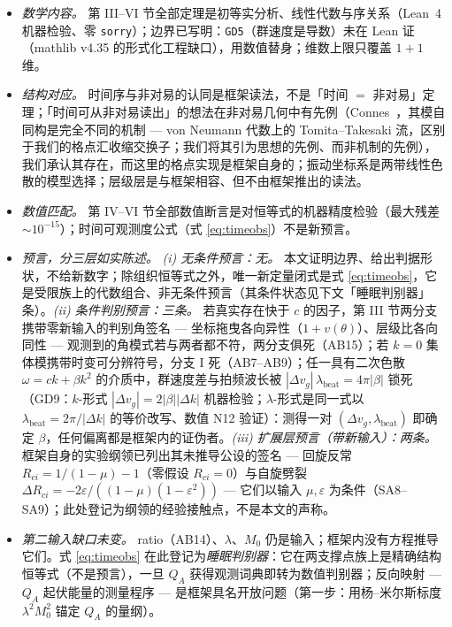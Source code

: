 \documentclass[aps,prd,preprint,superscriptaddress,amsmath,amssymb]{revtex4-2}
\begin{document}
\begin{itemize}
\item \emph{数学内容。} 第 III--VI 节全部定理是初等实分析、线性代数与序关系（Lean~4 机器检验、零 \texttt{sorry}）；边界已写明：\texttt{GD5}（群速度是导数）未在 Lean 证（mathlib v4.35 的形式化工程缺口），用数值替身；维数上限只覆盖 $1+1$ 维。
\item \emph{结构对应。} 时间序与非对易的认同是框架读法，不是「时间 $=$ 非对易」定理；「时间可从非对易读出」的想法在非对易几何中有先例（Connes~\cite{connes1994ncg}，其模自同构是完全不同的机制 --- von Neumann 代数上的 Tomita--Takesaki 流，区别于我们的格点汇收缩交换子；我们将其引为思想的先例、而非机制的先例），我们承认其存在，而这里的格点实现是框架自身的；振动坐标系是两带线性色散的模型选择；层级层是与框架相容、但不由框架推出的读法。
\item \emph{数值匹配。} 第 IV--VI 节全部数值断言是对恒等式的机器精度检验（最大残差 $\sim 10^{-15}$）；时间可观测度公式（式 \ref{eq:timeobs}）不是新预言。
\item \emph{预言，分三层如实陈述。} \emph{(i) 无条件预言：无。} 本文证明边界、给出判据形状，不给新数字；除组织恒等式之外，唯一新定量闭式是式 \ref{eq:timeobs}，它是受限族上的代数组合、非无条件预言（其条件状态见下文「睡眠判别器」条）。\emph{(ii) 条件判别预言：三条。} 若真实存在快于 $c$ 的因子，第 III 节两分支携带零新输入的判别角签名 --- 坐标拖曳各向异性（$1+v(\theta)$）、层级比各向同性 --- 观测到的角模式若与两者都不符，两分支俱死（AB15）；若 $k=0$ 集体模携带时变可分辨符号，分支 I 死（AB7--AB9）；任一具有二次色散 $\omega=ck+\beta k^2$ 的介质中，群速度差与拍频波长被 $|\Delta v_g|\,\lambda_{\mathrm{beat}}=4\pi|\beta|$ 锁死（GD9：$k$-形式 $|\Delta v_g|=2|\beta||\Delta k|$ 机器检验；$\lambda$-形式是同一式以 $\lambda_{\mathrm{beat}}=2\pi/|\Delta k|$ 的等价改写、数值 N12 验证）：测得一对 $(\Delta v_g,\lambda_{\mathrm{beat}})$ 即确定 $\beta$，任何偏离都是框架内的证伪者。\emph{(iii) 扩展层预言（带新输入）：两条。} 框架自身的实验纲领已列出其未推导公设的签名 --- 回旋反常 $R_{ci}=1/(1-\mu)-1$（零假设 $R_{ci}=0$）与自旋劈裂 $\Delta R_{ci}=-2\varepsilon/((1-\mu)(1-\varepsilon^2))$ --- 它们以输入 $\mu,\varepsilon$ 为条件（SA8--SA9）；此处登记为纲领的经验接触点，不是本文的声称。
\item \emph{第二输入缺口未变。} ratio（AB14）、$\lambda$、$M_0$ 仍是输入；框架内没有方程推导它们。式 \ref{eq:timeobs} 在此登记为\emph{睡眠判别器}：它在两支撑点族上是精确结构恒等式（不是预言），一旦 $Q_A$ 获得观测词典即转为数值判别器；反向映射 --- $Q_A$ 起伏能量的测量程序 --- 是框架具名开放问题（第一步：用杨--米尔斯标度 $\lambda^2 M_0^2$ 锚定 $Q_A$ 的量纲）。

\end{itemize}
\end{document}
